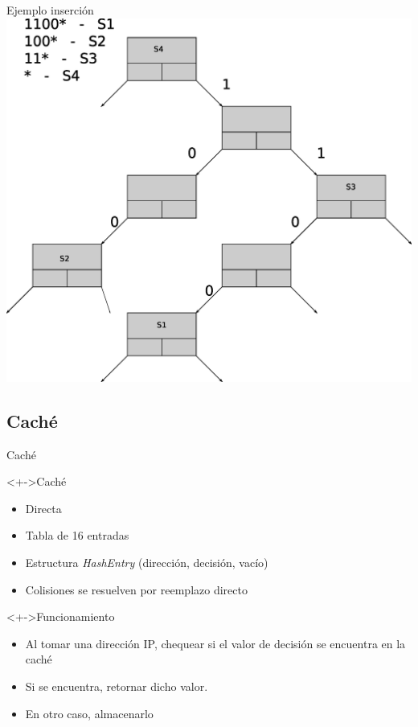 \documentclass[xcolor=dvipsnames]{beamer}
\begin{document}
\begin{frame}{Ejemplo inserción} 
\center	
\includegraphics[scale=0.30]{figures/lluinsert09.eps} 
\end{frame}

\subsection{Caché}

\begin{frame}{Caché}
  \begin{block}<+->{Caché} 	
    \begin{itemize}
      \scriptsize
     	\item Directa
	\item Tabla de 16 entradas
	\item Estructura \textit{HashEntry} (dirección, decisión, vacío)
	\item Colisiones se resuelven por reemplazo directo
     \end{itemize}
  \end{block}
  
  \begin{block}<+->{Funcionamiento} 	
    \begin{itemize}
      \scriptsize
     	\item Al tomar una dirección IP, chequear si el valor de decisión se encuentra en la caché
	\item Si se encuentra, retornar dicho valor.
	\item En otro caso, almacenarlo
     \end{itemize}
  \end{block}
\end{frame}
\end{document}

